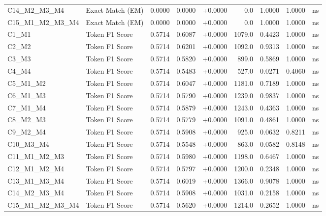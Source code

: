 \begin{table}[p]
\begin{tabular*}{\textwidth}{@{\extracolsep{\fill}} l l r r r r r r c @{}}
\addlinespace
C14\_M2\_M3\_M4 & Exact Match (EM)     & 0.0000 & 0.0000 & +0.0000 & 0.0 & 1.0000 & 1.0000 & ns \\
\addlinespace
C15\_M1\_M2\_M3\_M4 & Exact Match (EM)     & 0.0000 & 0.0000 & +0.0000 & 0.0 & 1.0000 & 1.0000 & ns \\
\addlinespace
C1\_M1          & Token F1 Score       & 0.5714 & 0.6087 & +0.0000 & 1079.0 & 0.4423 & 1.0000 & ns \\
\addlinespace
C2\_M2          & Token F1 Score       & 0.5714 & 0.6201 & +0.0000 & 1092.0 & 0.9313 & 1.0000 & ns \\
\addlinespace
C3\_M3          & Token F1 Score       & 0.5714 & 0.5820 & +0.0000 & 899.0 & 0.5869 & 1.0000 & ns \\
\addlinespace
C4\_M4          & Token F1 Score       & 0.5714 & 0.5483 & +0.0000 & 527.0 & 0.0271 & 0.4060 & ns \\
\addlinespace
C5\_M1\_M2      & Token F1 Score       & 0.5714 & 0.6047 & +0.0000 & 1181.0 & 0.7189 & 1.0000 & ns \\
\addlinespace
C6\_M1\_M3      & Token F1 Score       & 0.5714 & 0.5790 & +0.0000 & 1239.0 & 0.9837 & 1.0000 & ns \\
\addlinespace
C7\_M1\_M4      & Token F1 Score       & 0.5714 & 0.5879 & +0.0000 & 1243.0 & 0.4363 & 1.0000 & ns \\
\addlinespace
C8\_M2\_M3      & Token F1 Score       & 0.5714 & 0.5779 & +0.0000 & 1091.0 & 0.4861 & 1.0000 & ns \\
\addlinespace
C9\_M2\_M4      & Token F1 Score       & 0.5714 & 0.5908 & +0.0000 & 925.0 & 0.0632 & 0.8211 & ns \\
\addlinespace
C10\_M3\_M4     & Token F1 Score       & 0.5714 & 0.5548 & +0.0000 & 863.0 & 0.0582 & 0.8148 & ns \\
\addlinespace
C11\_M1\_M2\_M3 & Token F1 Score       & 0.5714 & 0.5980 & +0.0000 & 1198.0 & 0.6467 & 1.0000 & ns \\
\addlinespace
C12\_M1\_M2\_M4 & Token F1 Score       & 0.5714 & 0.5797 & +0.0000 & 1200.0 & 0.2348 & 1.0000 & ns \\
\addlinespace
C13\_M1\_M3\_M4 & Token F1 Score       & 0.5714 & 0.6019 & +0.0000 & 1366.0 & 0.9078 & 1.0000 & ns \\
\addlinespace
C14\_M2\_M3\_M4 & Token F1 Score       & 0.5714 & 0.5908 & +0.0000 & 1031.0 & 0.2158 & 1.0000 & ns \\
\addlinespace
C15\_M1\_M2\_M3\_M4 & Token F1 Score       & 0.5714 & 0.5620 & +0.0000 & 1214.0 & 0.2652 & 1.0000 & ns \\

\end{tabular*}
\end{table}
